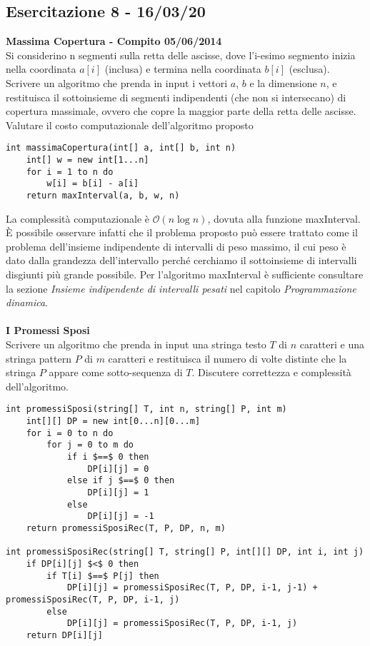\documentclass[../cheatSheetAlgoritmi.tex]{subfiles}
\begin{document}
\subsection{Esercitazione 8 - 16/03/20}
\textbf{Massima Copertura - Compito 05/06/2014}\\
Si considerino n segmenti sulla retta delle ascisse, dove l'i-esimo segmento inizia nella coordinata $a[i]$ (inclusa) e termina nella coordinata $b[i]$ (esclusa). Scrivere un algoritmo che prenda in input i vettori $a$, $b$ e la dimensione $n$, e restituisca il sottoinsieme di segmenti indipendenti (che non si intersecano) di copertura massimale, ovvero che copre la maggior parte della retta delle ascisse. Valutare il costo computazionale dell'algoritmo proposto
\begin{lstlisting}[caption=Massima copertura]
int massimaCopertura(int[] a, int[] b, int n)
    int[] w = new int[1...n]
    for i = 1 to n do
        w[i] = b[i] - a[i]
    return maxInterval(a, b, w, n)
\end{lstlisting}
La complessità computazionale è $\mathcal{O}(n \log n)$, dovuta alla funzione maxInterval. \\
È possibile osservare infatti che il problema proposto può essere trattato come il problema dell'insieme indipendente di intervalli di peso massimo, il cui peso è dato dalla grandezza dell'intervallo perché cerchiamo il sottoinsieme di intervalli disgiunti più grande possibile. Per l'algoritmo maxInterval è sufficiente consultare la sezione \emph{Insieme indipendente di intervalli pesati} nel capitolo \emph{Programmazione dinamica}.\\\\
\textbf{I Promessi Sposi}\\
Scrivere un algoritmo che prenda in input una stringa testo $T$ di $n$ caratteri e una stringa pattern $P$ di $m$ caratteri e restituisca il numero di volte distinte che la stringa $P$ appare come sotto-sequenza di $T$. Discutere correttezza e complessità dell'algoritmo.
\begin{lstlisting}[caption=Sottosequenze di un pattern in un testo (Promessi Sposi)]
int promessiSposi(string[] T, int n, string[] P, int m)
	int[][] DP = new int[0...n][0...m]
	for i = 0 to n do
		for j = 0 to m do
			if i $==$ 0 then
				DP[i][j] = 0
			else if j $==$ 0 then
				DP[i][j] = 1
			else 
				DP[i][j] = -1
	return promessiSposiRec(T, P, DP, n, m)
	
int promessiSposiRec(string[] T, string[] P, int[][] DP, int i, int j)
	if DP[i][j] $<$ 0 then
		if T[i] $==$ P[j] then
			DP[i][j] = promessiSposiRec(T, P, DP, i-1, j-1) + promessiSposiRec(T, P, DP, i-1, j)
		else
			DP[i][j] = promessiSposiRec(T, P, DP, i-1, j)
	return DP[i][j]
\end{lstlisting}
\end{document}
